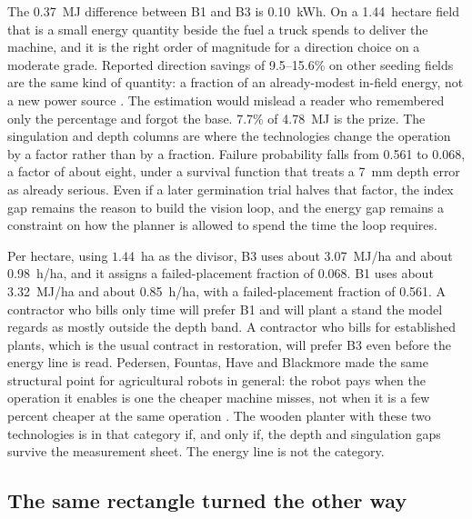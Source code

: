 The \SI{0.37}{MJ} difference between B1 and B3 is \SI{0.10}{kWh}. On a \num{1.44}~hectare field that is a small energy quantity beside the fuel a truck spends to deliver the machine, and it is the right order of magnitude for a direction choice on a moderate grade. Reported direction savings of \numrange{9.5}{15.6}\% on other seeding fields are the same kind of quantity: a fraction of an already-modest in-field energy, not a new power source \cite{vahdanjoo2023}. The estimation would mislead a reader who remembered only the percentage and forgot the base. \num{7.7}\% of \SI{4.78}{MJ} is the prize. The singulation and depth columns are where the technologies change the operation by a factor rather than by a fraction. Failure probability falls from \num{0.561} to \num{0.068}, a factor of about eight, under a survival function that treats a \SI{7}{mm} depth error as already serious. Even if a later germination trial halves that factor, the index gap remains the reason to build the vision loop, and the energy gap remains a constraint on how the planner is allowed to spend the time the loop requires.

Per hectare, using \(1.44\)~ha as the divisor, B3 uses about \SI{3.07}{MJ/ha} and about \SI{0.98}{h/ha}, and it assigns a failed-placement fraction of \num{0.068}. B1 uses about \SI{3.32}{MJ/ha} and about \SI{0.85}{h/ha}, with a failed-placement fraction of \num{0.561}. A contractor who bills only time will prefer B1 and will plant a stand the model regards as mostly outside the depth band. A contractor who bills for established plants, which is the usual contract in restoration, will prefer B3 even before the energy line is read. Pedersen, Fountas, Have and Blackmore made the same structural point for agricultural robots in general: the robot pays when the operation it enables is one the cheaper machine misses, not when it is a few percent cheaper at the same operation \cite{pedersen2006}. The wooden planter with these two technologies is in that category if, and only if, the depth and singulation gaps survive the measurement sheet. The energy line is not the category.

\subsection{The same rectangle turned the other way}

